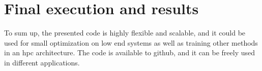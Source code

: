 \documentclass[10pt]{article}
\begin{document}
\section{Final execution and results}
To sum up, the presented code is highly flexible and scalable, and it could be used for small optimization on low end systems as well as training other methods in an hpc architecture.
The code is available to github, and it can be freely used in different applications.



\end{document}
